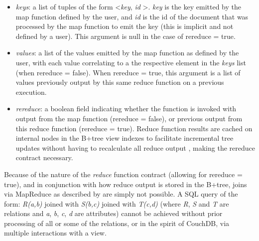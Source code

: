 \begin{itemize}
    \item \textit{keys}: a list of tuples of the form \textless \textit{key}, \textit{id} \textgreater. \textit{key} is the key emitted by the map function defined by the user, and \textit{id} is the id of the document that was processed by the map function to emit the key (this is implicit and not defined by a user). This argument is null in the case of rereduce = true.
    \item \textit{values}: a list of the values emitted by the map function as defined by the user, with each value correlating to a the respective element in the \textit{keys} list (when rereduce = false). When rereduce = true, this argument is a list of values previously output by this same reduce function on a previous execution.
    \item \textit{rereduce}: a boolean field indicating whether the function is invoked with output from the map function (rereduce = false), or previous output from this reduce function (rereduce = true). Reduce function results are cached on internal nodes in the B+tree view indexes to facilitate incremental tree updates without having to recalculate all reduce output \cite{slack25Oct}, making the rereduce contract necessary.
\end{itemize}

Because of the nature of the \textit{reduce} function contract (allowing for rereduce = true), and in conjunction with how reduce output is stored in the B+tree, joins via MapReduce as described by \cite{chandar2010} are simply not possible. A SQL query of the form: \textit{R(a,b)} joined with \textit{S(b,c)} joined with \textit{T(c,d)} (where \textit{R}, \textit{S} and \textit{T} are relations and \textit{a}, \textit{b}, \textit{c}, \textit{d} are attributes) cannot be achieved without prior processing of all or some of the relations, or in the spirit of CouchDB, via multiple interactions with a view.

